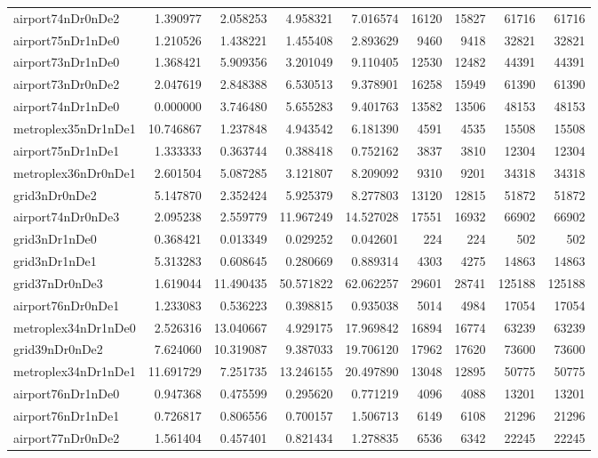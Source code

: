 \begin{longtable}{|l|r|r|r|r|r|r|r|r|}
airport74nDr0nDe2 & 1.390977 & 2.058253 & 4.958321 & 7.016574 & 16120 & 15827 & 61716 & 61716 \\
airport75nDr1nDe0 & 1.210526 & 1.438221 & 1.455408 & 2.893629 & 9460 & 9418 & 32821 & 32821 \\
airport73nDr1nDe0 & 1.368421 & 5.909356 & 3.201049 & 9.110405 & 12530 & 12482 & 44391 & 44391 \\
airport73nDr0nDe2 & 2.047619 & 2.848388 & 6.530513 & 9.378901 & 16258 & 15949 & 61390 & 61390 \\
airport74nDr1nDe0 & 0.000000 & 3.746480 & 5.655283 & 9.401763 & 13582 & 13506 & 48153 & 48153 \\
metroplex35nDr1nDe1 & 10.746867 & 1.237848 & 4.943542 & 6.181390 & 4591 & 4535 & 15508 & 15508 \\
airport75nDr1nDe1 & 1.333333 & 0.363744 & 0.388418 & 0.752162 & 3837 & 3810 & 12304 & 12304 \\
metroplex36nDr0nDe1 & 2.601504 & 5.087285 & 3.121807 & 8.209092 & 9310 & 9201 & 34318 & 34318 \\
grid3nDr0nDe2 & 5.147870 & 2.352424 & 5.925379 & 8.277803 & 13120 & 12815 & 51872 & 51872 \\
airport74nDr0nDe3 & 2.095238 & 2.559779 & 11.967249 & 14.527028 & 17551 & 16932 & 66902 & 66902 \\
grid3nDr1nDe0 & 0.368421 & 0.013349 & 0.029252 & 0.042601 & 224 & 224 & 502 & 502 \\
grid3nDr1nDe1 & 5.313283 & 0.608645 & 0.280669 & 0.889314 & 4303 & 4275 & 14863 & 14863 \\
grid37nDr0nDe3 & 1.619044 & 11.490435 & 50.571822 & 62.062257 & 29601 & 28741 & 125188 & 125188 \\
airport76nDr0nDe1 & 1.233083 & 0.536223 & 0.398815 & 0.935038 & 5014 & 4984 & 17054 & 17054 \\
metroplex34nDr1nDe0 & 2.526316 & 13.040667 & 4.929175 & 17.969842 & 16894 & 16774 & 63239 & 63239 \\
grid39nDr0nDe2 & 7.624060 & 10.319087 & 9.387033 & 19.706120 & 17962 & 17620 & 73600 & 73600 \\
metroplex34nDr1nDe1 & 11.691729 & 7.251735 & 13.246155 & 20.497890 & 13048 & 12895 & 50775 & 50775 \\
airport76nDr1nDe0 & 0.947368 & 0.475599 & 0.295620 & 0.771219 & 4096 & 4088 & 13201 & 13201 \\
airport76nDr1nDe1 & 0.726817 & 0.806556 & 0.700157 & 1.506713 & 6149 & 6108 & 21296 & 21296 \\
airport77nDr0nDe2 & 1.561404 & 0.457401 & 0.821434 & 1.278835 & 6536 & 6342 & 22245 & 22245 \\

\end{longtable}
